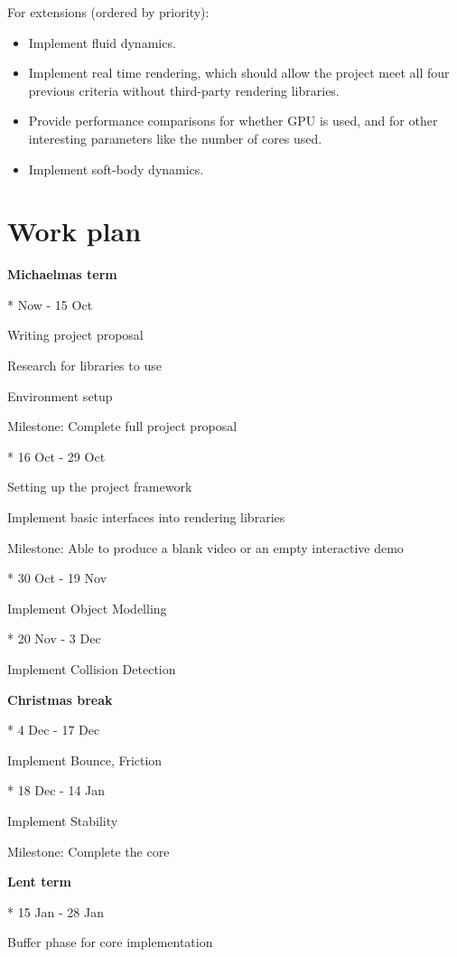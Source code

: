 \documentclass[12pt]{report}
\begin{document}
For extensions (ordered by priority):

\begin{itemize}
\item Implement fluid dynamics.

\item Implement real time rendering, which should allow the project meet all four previous criteria without third-party rendering libraries. 

\item Provide performance comparisons for whether GPU is used, and for other interesting parameters like the number of cores used.

\item Implement soft-body dynamics.
\end{itemize}

\section{Work plan}

\textbf{Michaelmas term}

* Now - 15 Oct

Writing project proposal

Research for libraries to use

Environment setup

Milestone: Complete full project proposal

* 16 Oct - 29 Oct

Setting up the project framework

Implement basic interfaces into rendering libraries

Milestone: Able to produce a blank video or an empty interactive demo

* 30 Oct - 19 Nov

Implement Object Modelling

* 20 Nov - 3 Dec

Implement Collision Detection

\textbf{Christmas break}

* 4 Dec - 17 Dec

Implement Bounce, Friction

* 18 Dec - 14 Jan

Implement Stability

Milestone: Complete the core

\textbf{Lent term}

* 15 Jan - 28 Jan

Buffer phase for core implementation
\end{document}
